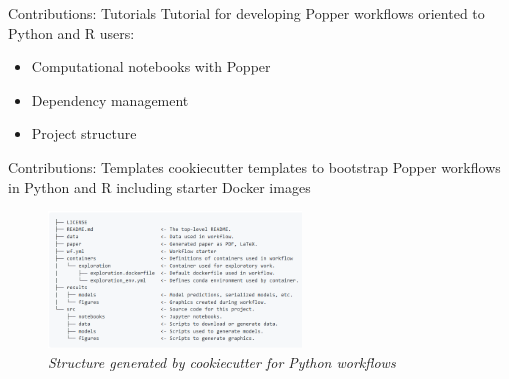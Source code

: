 \documentclass[aspectratio=169, 10pt]{beamer}
\begin{document}
\begin{frame}{Contributions: Tutorials}
    Tutorial for developing Popper workflows oriented to Python and R users:
    \begin{itemize}
        \item Computational notebooks with Popper 
        \item Dependency management
        \item Project structure
    \end{itemize}
\end{frame}

\begin{frame}{Contributions: Templates}
    \alert{cookiecutter} templates to bootstrap Popper workflows in Python and R
    including starter Docker images
    \begin{center}
        \begin{figure}
            \includegraphics[width=0.6\textwidth]{images/project_structure.png}
            \caption*{{\sl Structure generated by cookiecutter for Python workflows}}
        \end{figure}
    \end{center}
\end{frame}
\end{document}
